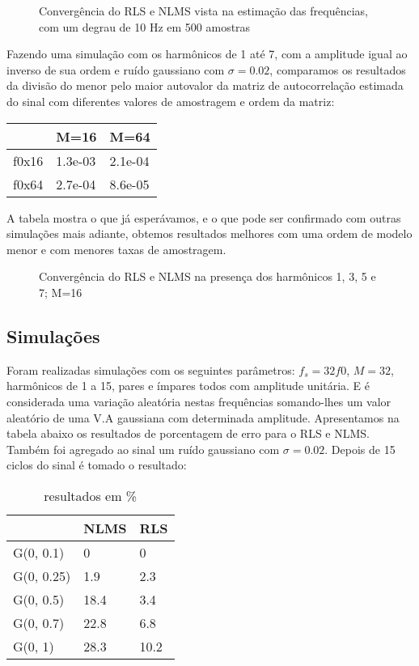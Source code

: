 \begin{figure}[h]
	\centering    
	\def\svgwidth{\columnwidth}
	
	\caption{Convergência do RLS e NLMS vista na estimação das frequências, com um degrau de 10 Hz em 500 amostras}
	\label{fig:your image label}
\end{figure}

Fazendo uma simulação com os harmônicos de 1 até 7, com a amplitude igual ao inverso de sua ordem e ruído gaussiano com $\sigma=0.02$, comparamos os resultados da divisão do menor pelo maior autovalor da matriz de autocorrelação estimada do sinal com diferentes valores de amostragem e ordem da matriz:

\begin{table}[H]
	\centering
	\begin{tabular}{l|l|l}
		   & M=16 & M=64 \\
		\hline 
		f0x16      & 1.3e-03 & 2.1e-04 \\
		f0x64      & 2.7e-04  & 8.6e-05       
	\end{tabular}
\end{table}

A tabela mostra o que já esperávamos, e o que pode ser confirmado com outras simulações mais adiante, obtemos resultados melhores com uma ordem de modelo menor e com menores taxas de amostragem.

\begin{figure}[h]
	\centering    
	\def\svgwidth{\columnwidth}
	
	\caption{Convergência do RLS e NLMS na presença dos harmônicos 1, 3, 5 e 7; M=16}
	\label{fig:your image label}
\end{figure}

\subsection{Simulações}

\indent Foram realizadas simulações com os seguintes parâmetros: $f_s=32f0$, $M=32$, harmônicos de 1 a 15, pares e ímpares todos com amplitude unitária. E é considerada uma variação aleatória nestas frequências somando-lhes um valor aleatório de uma V.A gaussiana com determinada amplitude. Apresentamos na tabela abaixo os resultados de porcentagem de erro para o RLS e NLMS. Também foi agregado ao sinal um ruído gaussiano com $\sigma=0.02$. Depois de 15 ciclos do sinal é tomado o resultado:

\begin{table}[H]
	\centering
	\begin{tabular}{l|l|l}
	              & NLMS & RLS \\
		\hline 
		G(0, 0.1)  & 0     & 0 \\
		G(0, 0.25) & 1.9   & 2.3  \\
		G(0, 0.5)  & 18.4  & 3.4  \\
		G(0, 0.7)  & 22.8  & 6.8  \\
		G(0, 1)    & 28.3  & 10.2 \\ 
	\end{tabular}
	\caption{resultados em \%}
\end{table}

